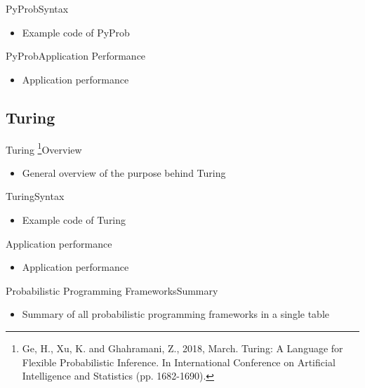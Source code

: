 \documentclass[AERbeamer%
              ,optEnglish%
              ,optBiber%
              ,optBibstyleAlphabetic%
              ,optBeamerClassicFormat%
              ]{AERlatex}%
\begin{document}
\begin{frame}[c]{PyProb}{Syntax}
    \centering
    \begin{itemize}
        \item Example code of PyProb
    \end{itemize}
\end{frame}


\begin{frame}[c]{PyProb}{Application Performance}
    \centering
    \begin{itemize}
        \item Application performance
    \end{itemize}
\end{frame}


\subsection{Turing}
\begin{frame}[c]{Turing \footnote{Ge, H., Xu, K. and Ghahramani, Z., 2018, March. Turing: A Language for Flexible
                                  Probabilistic Inference. In International Conference on Artificial Intelligence
                                  and Statistics (pp. 1682-1690).}}{Overview}
    \centering
    \begin{itemize}
        \item General overview of the purpose behind Turing
    \end{itemize}
\end{frame}


\begin{frame}[c]{Turing}{Syntax}
    \centering
    \begin{itemize}
        \item Example code of Turing
    \end{itemize}
\end{frame}


\begin{frame}[c]{Application performance}
    \centering
    \begin{itemize}
        \item Application performance
    \end{itemize}
\end{frame}


\begin{frame}[c]{Probabilistic Programming Frameworks}{Summary}
    \centering
    \begin{itemize}
        \item Summary of all probabilistic programming frameworks in a single table
    \end{itemize}
\end{frame}
\end{document}

